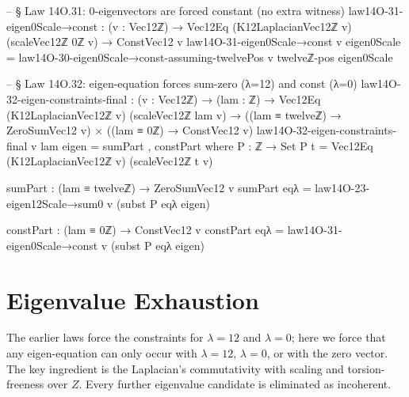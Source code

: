 \documentclass[11pt,a4paper]{book}
\def\mathbb#1{#1}%
\begin{document}
\begin{code}
-- § Law 14O.31: 0-eigenvectors are forced constant (no extra witness)
law14O-31-eigen0Scale→const : (v : Vec12ℤ) →
  Vec12Eq (K12LaplacianVec12ℤ v) (scaleVec12ℤ 0ℤ v) →
  ConstVec12 v
law14O-31-eigen0Scale→const v eigen0Scale =
  law14O-30-eigen0Scale→const-assuming-twelvePos v twelveℤ-pos eigen0Scale

-- § Law 14O.32: eigen-equation forces sum-zero (λ=12) and const (λ=0)
law14O-32-eigen-constraints-final : (v : Vec12ℤ) → (lam : ℤ) →
  Vec12Eq (K12LaplacianVec12ℤ v) (scaleVec12ℤ lam v) →
  ((lam ≡ twelveℤ) → ZeroSumVec12 v) ×
  ((lam ≡ 0ℤ) → ConstVec12 v)
law14O-32-eigen-constraints-final v lam eigen = sumPart , constPart
  where
    P : ℤ → Set
    P t = Vec12Eq (K12LaplacianVec12ℤ v) (scaleVec12ℤ t v)

    sumPart : (lam ≡ twelveℤ) → ZeroSumVec12 v
    sumPart eqλ = law14O-23-eigen12Scale→sum0 v (subst P eqλ eigen)

    constPart : (lam ≡ 0ℤ) → ConstVec12 v
    constPart eqλ = law14O-31-eigen0Scale→const v (subst P eqλ eigen)
\end{code}


\section{Eigenvalue Exhaustion}

The earlier laws force the constraints for $\lambda=12$ and $\lambda=0$;
here we force that any eigen-equation can only occur with
$\lambda=12$, $\lambda=0$, or with the zero vector.
The key ingredient is the Laplacian's commutativity with scaling
and torsion-freeness over $\mathbb{Z}$.  Every further eigenvalue candidate is
eliminated as incoherent.
\end{document}
